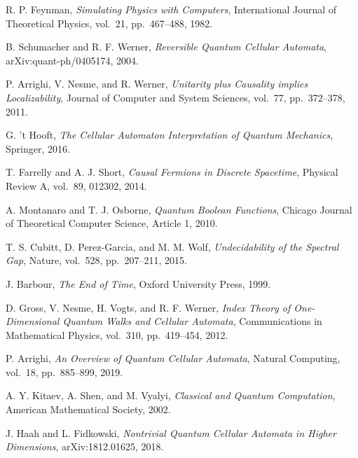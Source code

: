 \documentclass[11pt]{article}
\theoremstyle{definition}
\theoremstyle{remark}
\begin{document}
\begin{thebibliography}{99}

R. P. Feynman,
\textit{Simulating Physics with Computers},
International Journal of Theoretical Physics, vol.~21, pp.~467--488, 1982.

B. Schumacher and R. F. Werner,
\textit{Reversible Quantum Cellular Automata},
arXiv:quant-ph/0405174, 2004.

P. Arrighi, V. Nesme, and R. Werner,
\textit{Unitarity plus Causality implies Localizability},
Journal of Computer and System Sciences, vol.~77, pp.~372--378, 2011.

G. 't Hooft,
\textit{The Cellular Automaton Interpretation of Quantum Mechanics},
Springer, 2016.

T. Farrelly and A. J. Short,
\textit{Causal Fermions in Discrete Spacetime},
Physical Review A, vol.~89, 012302, 2014.

A. Montanaro and T. J. Osborne,
\textit{Quantum Boolean Functions},
Chicago Journal of Theoretical Computer Science, Article 1, 2010.

T. S. Cubitt, D. Perez-Garcia, and M. M. Wolf,
\textit{Undecidability of the Spectral Gap},
Nature, vol.~528, pp.~207--211, 2015.

J. Barbour,
\textit{The End of Time},
Oxford University Press, 1999.

D. Gross, V. Nesme, H. Vogts, and R. F. Werner,
\textit{Index Theory of One-Dimensional Quantum Walks and Cellular Automata},
Communications in Mathematical Physics, vol.~310, pp.~419--454, 2012.

P. Arrighi,
\textit{An Overview of Quantum Cellular Automata},
Natural Computing, vol.~18, pp.~885--899, 2019.

A. Y. Kitaev, A. Shen, and M. Vyalyi,
\textit{Classical and Quantum Computation},
American Mathematical Society, 2002.

J. Haah and L. Fidkowski,
\textit{Nontrivial Quantum Cellular Automata in Higher Dimensions},
arXiv:1812.01625, 2018.

\end{thebibliography}
\end{document}
